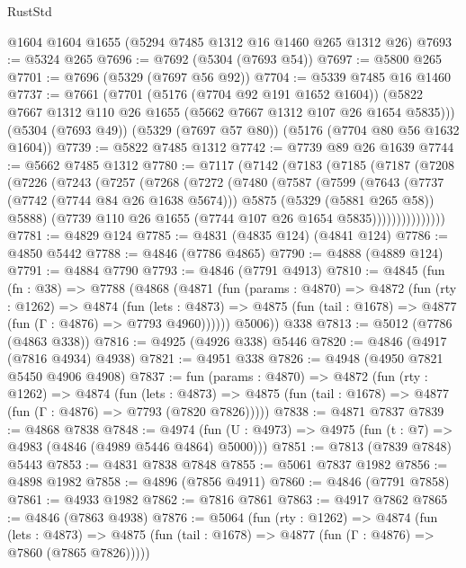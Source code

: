\begin{lexlean}{RustStd}
\begin{coremodule}
    @1604
    @1604
    @1655
    (@5294 @7485 @1312 @16 @1460 @265 @1312 @26)
@7693 := @5324 @265
@7696 := @7692 (@5304 (@7693 @54))
@7697 := @5800 @265
@7701 := @7696 (@5329 (@7697 @56 @92))
@7704 := @5339 @7485 @16 @1460
@7737 := @7661
    (@7701
      (@5176 (@7704 @92 @191 @1652 @1604))
      (@5822 @7667 @1312 @110 @26 @1655 (@5662 @7667 @1312 @107 @26 @1654 @5835)))
    (@5304 (@7693 @49))
    (@5329 (@7697 @57 @80))
    (@5176 (@7704 @80 @56 @1632 @1604))
@7739 := @5822 @7485 @1312
@7742 := @7739 @89 @26 @1639
@7744 := @5662 @7485 @1312
@7780 := @7117
    (@7142
      (@7183
        (@7185
          (@7187
            (@7208
              (@7226
                (@7243
                  (@7257
                    (@7268
                      (@7272
                        (@7480
                          (@7587
                            (@7599
                              (@7643
                                (@7737 (@7742 (@7744 @84 @26 @1638 @5674)))
                                @5875
                                (@5329 (@5881 @265 @58))
                                @5888)
                              (@7739 @110 @26 @1655 (@7744 @107 @26 @1654 @5835)))))))))))))))
@7781 := @4829 @124
@7785 := @4831 (@4835 @124) (@4841 @124)
@7786 := @4850 @5442
@7788 := @4846 (@7786 @4865)
@7790 := @4888 (@4889 @124)
@7791 := @4884 @7790
@7793 := @4846 (@7791 @4913)
@7810 := @4845
    (fun (fn : @38) =>
    @7788
      (@4868
        (@4871
          (fun (params : @4870) =>
          @4872
            (fun (rty : @1262) =>
            @4874
              (fun (lets : @4873) =>
              @4875 (fun (tail : @1678) => @4877 (fun (Γ : @4876) => @7793 @4960))))))
        @5006))
    @338
@7813 := @5012 (@7786 (@4863 @338))
@7816 := @4925 (@4926 @338) @5446
@7820 := @4846 (@4917 (@7816 @4934) @4938)
@7821 := @4951 @338
@7826 := @4948 (@4950 @7821 @5450 @4906 @4908)
@7837 := fun (params : @4870) =>
  @4872
    (fun (rty : @1262) =>
    @4874
      (fun (lets : @4873) =>
      @4875 (fun (tail : @1678) => @4877 (fun (Γ : @4876) => @7793 (@7820 @7826)))))
@7838 := @4871 @7837
@7839 := @4868 @7838
@7848 := @4974 (fun (U : @4973) => @4975 (fun (t : @7) => @4983 (@4846 (@4989 @5446 @4864) @5000)))
@7851 := @7813 (@7839 @7848) @5443
@7853 := @4831 @7838 @7848
@7855 := @5061 @7837 @1982
@7856 := @4898 @1982
@7858 := @4896 (@7856 @4911)
@7860 := @4846 (@7791 @7858)
@7861 := @4933 @1982
@7862 := @7816 @7861
@7863 := @4917 @7862
@7865 := @4846 (@7863 @4938)
@7876 := @5064
    (fun (rty : @1262) =>
    @4874
      (fun (lets : @4873) =>
      @4875 (fun (tail : @1678) => @4877 (fun (Γ : @4876) => @7860 (@7865 @7826)))))

\end{coremodule}
\end{lexlean}
